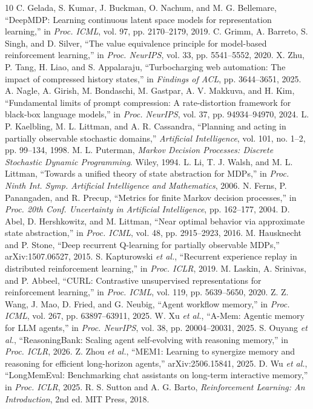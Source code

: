 \documentclass{article}
\begin{document}
\begin{thebibliography}{10}
 C. Gelada, S. Kumar, J. Buckman, O. Nachum, and M. G. Bellemare, ``DeepMDP: Learning continuous latent space models for representation learning,'' in \emph{Proc. ICML}, vol. 97, pp. 2170--2179, 2019.
 C. Grimm, A. Barreto, S. Singh, and D. Silver, ``The value equivalence principle for model-based reinforcement learning,'' in \emph{Proc. NeurIPS}, vol. 33, pp. 5541--5552, 2020.
 X. Zhu, P. Tang, H. Liao, and S. Appalaraju, ``Turbocharging web automation: The impact of compressed history states,'' in \emph{Findings of ACL}, pp. 3644--3651, 2025.
 A. Nagle, A. Girish, M. Bondaschi, M. Gastpar, A. V. Makkuva, and H. Kim, ``Fundamental limits of prompt compression: A rate-distortion framework for black-box language models,'' in \emph{Proc. NeurIPS}, vol. 37, pp. 94934--94970, 2024.
 L. P. Kaelbling, M. L. Littman, and A. R. Cassandra, ``Planning and acting in partially observable stochastic domains,'' \emph{Artificial Intelligence}, vol. 101, no. 1--2, pp. 99--134, 1998.
 M. L. Puterman, \emph{Markov Decision Processes: Discrete Stochastic Dynamic Programming}. Wiley, 1994.
 L. Li, T. J. Walsh, and M. L. Littman, ``Towards a unified theory of state abstraction for MDPs,'' in \emph{Proc. Ninth Int. Symp. Artificial Intelligence and Mathematics}, 2006.
 N. Ferns, P. Panangaden, and R. Precup, ``Metrics for finite Markov decision processes,'' in \emph{Proc. 20th Conf. Uncertainty in Artificial Intelligence}, pp. 162--177, 2004.
 D. Abel, D. Hershkowitz, and M. Littman, ``Near optimal behavior via approximate state abstraction,'' in \emph{Proc. ICML}, vol. 48, pp. 2915--2923, 2016.
 M. Hausknecht and P. Stone, ``Deep recurrent Q-learning for partially observable MDPs,'' arXiv:1507.06527, 2015.
 S. Kapturowski \emph{et al.}, ``Recurrent experience replay in distributed reinforcement learning,'' in \emph{Proc. ICLR}, 2019.
 M. Laskin, A. Srinivas, and P. Abbeel, ``CURL: Contrastive unsupervised representations for reinforcement learning,'' in \emph{Proc. ICML}, vol. 119, pp. 5639--5650, 2020.
 Z. Z. Wang, J. Mao, D. Fried, and G. Neubig, ``Agent workflow memory,'' in \emph{Proc. ICML}, vol. 267, pp. 63897--63911, 2025.
 W. Xu \emph{et al.}, ``A-Mem: Agentic memory for LLM agents,'' in \emph{Proc. NeurIPS}, vol. 38, pp. 20004--20031, 2025.
 S. Ouyang \emph{et al.}, ``ReasoningBank: Scaling agent self-evolving with reasoning memory,'' in \emph{Proc. ICLR}, 2026.
 Z. Zhou \emph{et al.}, ``MEM1: Learning to synergize memory and reasoning for efficient long-horizon agents,'' arXiv:2506.15841, 2025.
 D. Wu \emph{et al.}, ``LongMemEval: Benchmarking chat assistants on long-term interactive memory,'' in \emph{Proc. ICLR}, 2025.
 R. S. Sutton and A. G. Barto, \emph{Reinforcement Learning: An Introduction}, 2nd ed. MIT Press, 2018.
\end{thebibliography}
\end{document}
